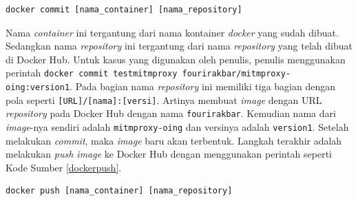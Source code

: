 	\newline
	\begin{minipage}{\linewidth}
	\begin{lstlisting}[caption=Perintah untuk \textit{Commit} Kontainer \textit{Docker},language=Python,label=dockercommit]
	docker commit [nama_container] [nama_repository]
	\end{lstlisting}
	\end{minipage}
    Nama \textit{container} ini tergantung dari nama kontainer \textit{docker} yang sudah dibuat. Sedangkan nama \textit{repository} ini tergantung dari nama \textit{repository} yang telah dibuat di Docker Hub. Untuk kasus yang digunakan oleh penulis, penulis menggunakan perintah \texttt{docker commit testmitmproxy fourirakbar/mitmproxy-oing:version1}. Pada bagian nama \textit{repository} ini memiliki tiga bagian dengan pola seperti \texttt{[URL]/[nama]:[versi]}. Artinya membuat \textit{image} dengan URL \textit{repository} pada Docker Hub dengan nama \texttt{fourirakbar}. Kemudian nama dari \textit{image}-nya sendiri adalah \texttt{mitmproxy-oing} dan versinya adalah \texttt{version1}. Setelah melakukan \textit{commit}, maka \textit{image} baru akan terbentuk. Langkah terakhir adalah melakukan \textit{push image} ke Docker Hub dengan menggunakan perintah seperti Kode Sumber \ref{dockerpush}.
    \newline
    \begin{minipage}{\linewidth}
   	\begin{lstlisting}[caption=Perintah untuk \textit{Push Image} ke Docker Hub,language=Python,label=dockerpush]
  docker push [nama_container] [nama_repository]
   	\end{lstlisting}
    \end{minipage}
    
